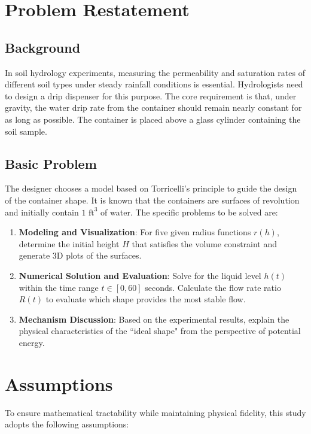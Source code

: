 \documentclass[a4paper, 12pt]{article}
\begin{document}
\newpage
\tableofcontents
\newpage


\section{Problem Restatement}

\subsection{Background}
In soil hydrology experiments, measuring the permeability and saturation rates of different soil types under steady rainfall conditions is essential. Hydrologists need to design a drip dispenser for this purpose. The core requirement is that, under gravity, the water drip rate from the container should remain nearly constant for as long as possible. The container is placed above a glass cylinder containing the soil sample.

\subsection{Basic Problem}
The designer chooses a model based on Torricelli's principle to guide the design of the container shape. It is known that the containers are surfaces of revolution and initially contain $1 \text{ ft}^3$ of water. The specific problems to be solved are:
\begin{enumerate}
    \item \textbf{Modeling and Visualization}: For five given radius functions $r(h)$, determine the initial height $H$ that satisfies the volume constraint and generate 3D plots of the surfaces.
    \item \textbf{Numerical Solution and Evaluation}: Solve for the liquid level $h(t)$ within the time range $t \in [0, 60]$ seconds. Calculate the flow rate ratio $R(t)$ to evaluate which shape provides the most stable flow.
    \item \textbf{Mechanism Discussion}: Based on the experimental results, explain the physical characteristics of the ``ideal shape" from the perspective of potential energy.
\end{enumerate}

\section{Assumptions}
To ensure mathematical tractability while maintaining physical fidelity, this study adopts the following assumptions:
\end{document}
